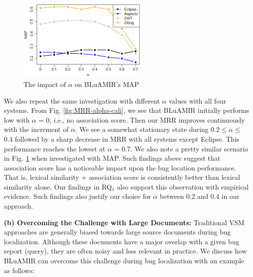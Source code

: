\documentclass[sigconf,review,anonymous]{acmart}
\begin{document}
\begin{figure}[!t]
	\centering
	\includegraphics[width=2.5in]{alpha-calibration-map}
	\vspace{-.3cm}
	\caption{The impact of $\alpha$ on BLuAMIR's MAP}
	\label{fig:MAP-alpha-cali}
\end{figure}
We also repeat the same investigation with different $\alpha$ values with all four systems. From Fig. \ref{fig:MRR-alpha-cali}, we see that BLuAMIR initially performs low with $\alpha$ = 0, i.e., no association score. Then our MRR improves continuously with the increment of $\alpha$. We see a somewhat stationary state during 0.2$\le\alpha\le$0.4 followed by a sharp decrease in MRR with all systems except Eclipse.
This performance reaches the lowest at $\alpha$ = 0.7.
We also note a pretty similar scenario in Fig. \ref{fig:MAP-alpha-cali} when investigated with MAP.
Such findings above suggest that association score has a noticeable impact upon the bug location performance. That is, lexical similarity + association score is consistently better than lexical similarity alone. Our findings in RQ$_1$ also support this observation with empirical evidence. Such findings also justify our choice for $\alpha$ between 0.2 and 0.4 in our approach. 

\textbf{(b) Overcoming the Challenge with Large Documents:}
Traditional VSM approaches are generally biased towards large source documents during bug localization. Although these documents have a major overlap with a given bug report (query), they are often noisy and less relevant in practice. We discuss how BLuAMIR can overcome this challenge during bug localization with an example as follows:
\end{document}
